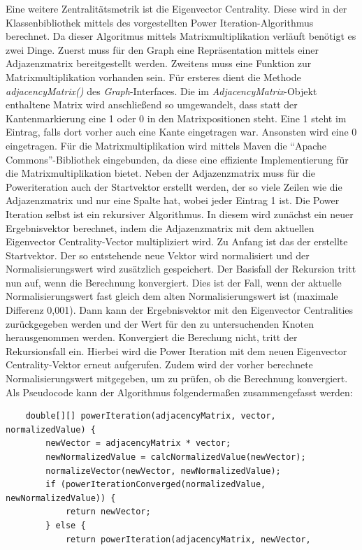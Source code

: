 \documentclass[a4paper,12pt,ngerman,chapterprefix=false,listof=totoc,bibliography=totoc]{scrreprt}
\begin{document}
{{{Eine weitere Zentralitätsmetrik ist die Eigenvector Centrality. Diese wird in der Klassenbibliothek mittels des vorgestellten Power Iteration-Algorithmus berechnet. Da dieser Algoritmus mittels Matrixmultiplikation verläuft benötigt es zwei Dinge. Zuerst muss für den Graph eine Repräsentation mittels einer Adjazenzmatrix bereitgestellt werden. Zweitens muss eine Funktion zur Matrixmultiplikation vorhanden sein. Für ersteres dient die Methode \textit{adjacencyMatrix()} des \textit{Graph}-Interfaces. Die im \textit{AdjacencyMatrix}-Objekt enthaltene Matrix wird anschließend so umgewandelt, dass statt der Kantenmarkierung eine 1 oder 0 in den Matrixpositionen steht. Eine 1 steht im Eintrag, falls dort vorher auch eine Kante eingetragen war. Ansonsten wird eine 0 eingetragen. Für die Matrixmultiplikation wird mittels Maven die "`Apache Commons"'-Bibliothek eingebunden, da diese eine effiziente Implementierung für die Matrixmultiplikation bietet. Neben der Adjazenzmatrix muss für die Poweriteration auch der Startvektor erstellt werden, der so viele Zeilen wie die Adjazenzmatrix und nur eine Spalte hat, wobei jeder Eintrag 1 ist. Die Power Iteration selbst ist ein rekursiver Algorithmus. In diesem wird zunächst ein neuer Ergebnisvektor berechnet, indem die Adjazenzmatrix mit dem aktuellen Eigenvector Centrality-Vector multipliziert wird. Zu Anfang ist das der erstellte Startvektor. Der so entstehende neue Vektor wird normalisiert und der Normalisierungswert wird zusätzlich gespeichert. Der Basisfall der Rekursion tritt nun auf, wenn die Berechnung konvergiert. Dies ist der Fall, wenn der aktuelle Normalisierungswert fast gleich dem alten Normalisierungswert ist (maximale Differenz 0,001). Dann kann der Ergebnisvektor mit den Eigenvector Centralities zurückgegeben werden und der Wert für den zu untersuchenden Knoten herausgenommen werden. Konvergiert die Berechung nicht, tritt der Rekursionsfall ein. Hierbei wird die Power Iteration mit dem neuen Eigenvector Centrality-Vektor erneut aufgerufen. Zudem wird der vorher berechnete Normalisierungswert mitgegeben, um zu prüfen, ob die Berechnung konvergiert. Als Pseudocode kann der Algorithmus folgendermaßen zusammengefasst werden:
\begin{lstlisting}
	double[][] powerIteration(adjacencyMatrix, vector, normalizedValue) {
		newVector = adjacencyMatrix * vector;
		newNormalizedValue = calcNormalizedValue(newVector);
		normalizeVector(newVector, newNormalizedValue);
		if (powerIterationConverged(normalizedValue, newNormalizedValue)) {
			return newVector;
		} else {
			return powerIteration(adjacencyMatrix, newVector,

\end{lstlisting}}}}
\end{document}
